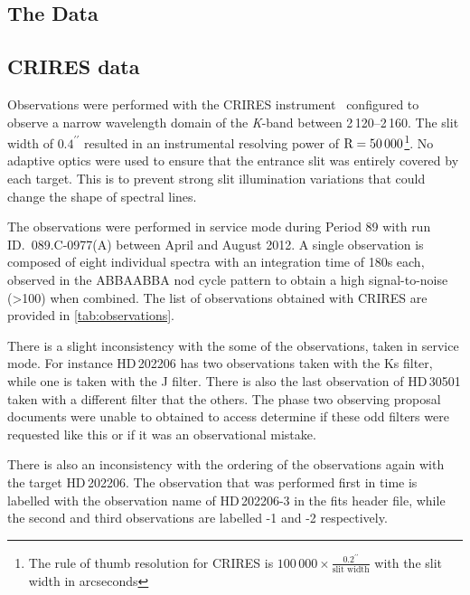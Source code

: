 \begin{landscape}
    
    
\end{landscape}

\subsection{The Data}

\subsection{CRIRES data}
\label{subsec:CRIRES}
Observations were performed with the {CRIRES} instrument~\citep{kaeufl_crires_2004} configured to observe a narrow wavelength domain of the \emph{K}-band between 2\,120--2\,160\nm{}.
The slit width of \(0.4^{\prime\prime}\) resulted in an instrumental resolving power of \(\textrm{R}=50\,000\)\footnote{The rule of thumb resolution for {CRIRES} is \(100\,000\times \frac{0.2^{\prime\prime}}{\textrm{slit width}}\) with the slit width in arcseconds}.
No adaptive optics were used to ensure that the entrance slit was entirely covered by each target.
This is to prevent strong slit illumination variations that could change the shape of spectral lines.

The observations were performed in service mode during Period 89 with run {ID.~089.C-0977(A)} between April and August 2012.
A single observation is composed of eight individual spectra with an integration time of 180\si{\second} each, observed in the {ABBAABBA} nod cycle pattern to obtain a high signal-to-noise (>100) when combined.
The list of observations obtained with {CRIRES} are provided in \cref{tab:observations}.

There is a slight inconsistency with the some of the observations, taken in service mode.
For instance {HD\,202206} has two observations taken with the {Ks} filter, while one is taken with the {J} filter.
There is also the last observation of {HD\,30501} taken with a different filter that the others.
The phase two observing proposal documents were unable to obtained to access determine if these odd filters were requested like this or if it was an observational mistake.

There is also an inconsistency with the ordering of the observations again with the target {HD\,202206}.
The observation that was performed first in time is labelled with the observation name of {HD\,202206-3} in the fits header file, while the second and third observations are labelled -1 and -2 respectively.

